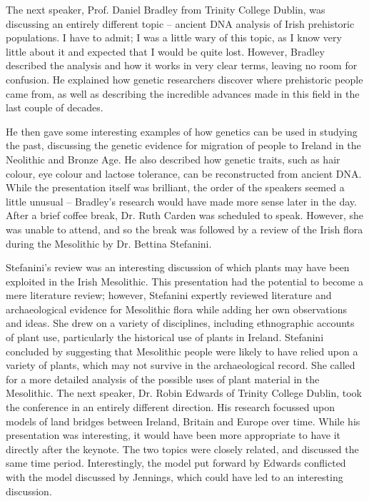 \documentclass[%
	]{ijsra}
\begin{document}
The next speaker, Prof. Daniel Bradley from Trinity College Dublin, was discussing an entirely different topic – ancient DNA analysis of Irish prehistoric populations. I have to admit; I was a little wary of this topic, as I know very little about it and expected that I would be quite lost. However, Bradley described the analysis and how it works in very clear terms, leaving no room for confusion. He explained how genetic researchers discover where prehistoric people came from, as well as describing the incredible advances made in this field in the last couple of decades. 

He then gave some interesting examples of how genetics can be used in studying the past, discussing the genetic evidence for migration of people to Ireland in the Neolithic and Bronze Age. He also described how genetic traits, such as hair colour, eye colour and lactose tolerance, can be reconstructed from ancient DNA. While the presentation itself was brilliant, the order of the speakers seemed a little unusual – Bradley’s research would have made more sense later in the day. 
After a brief coffee break, Dr. Ruth Carden was scheduled to speak. However, she was unable to attend, and so the break was followed by a review of the Irish flora during the Mesolithic by Dr. Bettina Stefanini. 

Stefanini’s review was an interesting discussion of which plants may have been exploited in the Irish Mesolithic. This presentation had the potential to become a mere literature review; however, Stefanini expertly reviewed literature and archaeological evidence for Mesolithic flora while adding her own observations and ideas. She drew on a variety of disciplines, including ethnographic accounts of plant use, particularly the historical use of plants in Ireland. Stefanini concluded by suggesting that Mesolithic people were likely to have relied upon a variety of plants, which may not survive in the archaeological record. She called for a more detailed analysis of the possible uses of plant material in the Mesolithic. 
The next speaker, Dr. Robin Edwards of Trinity College Dublin, took the conference in an entirely different direction. His research focussed upon models of land bridges between Ireland, Britain and Europe over time. While his presentation was interesting, it would have been more appropriate to have it directly after the keynote. The two topics were closely related, and discussed the same time period. Interestingly, the model put forward by Edwards conflicted with the model discussed by Jennings, which could have led to an interesting discussion. 
\end{document}
